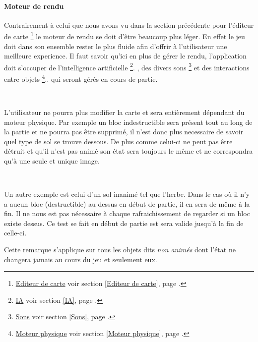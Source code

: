 		\paragraph{Moteur de rendu\\}
		
			\hypertarget{Moteur de rendu}{}
			\label{Moteur de rendu}
		
			Contrairement à celui que nous avons vu dans la section précédente pour
			l'éditeur de carte
			\footnote{
				\hyperlink{Editeur de carte}{Editeur de carte}
				\og voir section \ref{Editeur de carte}, page \pageref{Editeur de carte}.\fg
			}
			le moteur de rendu se doit d'être beaucoup plus léger. En effet le jeu doit
			dans son ensemble rester le plus fluide afin d'offrir à l'utilisateur une meilleure
			experience. Il faut savoir qu'ici en plus de gérer le rendu, l'application
			doit s'occuper de l'intelligence artificielle
			\footnote{
				\hyperlink{IA}{IA}
				\og voir section \ref{IA}, page \pageref{IA}.\fg
			}.
			, des divers sons
			\footnote{
				\hyperlink{Sons}{Sons}
				\og voir section \ref{Sons}, page \pageref{Sons}.\fg
			} et des interactions entre objets
			 \footnote{
				\hyperlink{Moteur physique}{Moteur physique}
				\og voir section \ref{Moteur physique}, page \pageref{Moteur physique}.\fg
			}..
			qui seront gérés en cours de partie.		
			
			$\,$	
			
			L'utilisateur ne pourra plus modifier la carte et sera
			entièrement dépendant du moteur physique\footnotemark[3]. Par
			exemple un bloc indestructible sera présent tout au long de la
			partie et ne pourra pas être supprimé, il n'est donc plus necessaire de
			savoir quel type de sol se trouve dessous. De plus comme celui-ci ne peut pas
			être détruit et qu'il n'est pas animé son état sera toujours le même et ne
			correspondra qu'à une seule et unique image.
			
			$\,$			
			
			Un autre exemple est celui d'un sol inanimé tel que l'herbe. Dans le cas où
			il n'y a aucun bloc (destructible) au dessus en début de partie, il en sera
			de même à la fin. Il ne nous est pas nécessaire à chaque
			rafraichissement de regarder si un bloc existe dessus. Ce test se fait en
			début de partie est sera valide jusqu'à la fin de celle-ci.
			
			
			Cette remarque s'applique sur tous les objets dits \emph{non animés} dont
			l'état ne changera jamais au cours du jeu et seulement eux.
			
